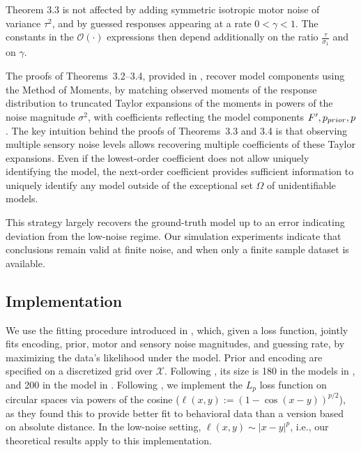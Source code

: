 \begin{thm*} %
%


Theorem 3.3 is not affected by adding symmetric isotropic motor noise of variance $\tau^2$, and by guessed responses appearing at a rate $0 < \gamma < 1$. The constants in the $\mathcal{O}(\cdot)$ expressions then depend additionally on the ratio $\frac{\tau}{\sigma_1}$ and on $\gamma$.
\end{thm*}







The proofs of Theorems~3.2--3.4, provided in , recover model components using the Method of Moments, %
by matching observed moments of the response distribution to truncated Taylor expansions of the moments in powers of the noise magnitude $\sigma^2$, with coefficients reflecting the model components $F', p_{prior}, p$.
The key intuition behind the proofs of Theorems~3.3 and 3.4 is that observing multiple sensory noise levels allows recovering multiple coefficients of these Taylor expansions. Even if the lowest-order coefficient does not allow uniquely identifying the model, the next-order coefficient provides sufficient information to uniquely identify any model outside of the exceptional set $\Omega$ of unidentifiable models.



This strategy largely recovers the ground-truth model up to an error indicating deviation from the low-noise regime.
Our simulation experiments indicate that conclusions remain valid at finite noise, and when only a finite sample dataset is available.




\subsection*{Implementation}
We use the fitting procedure introduced in \cite{hahn2024unifying}, which, given a loss function, jointly fits encoding, prior, motor and sensory noise magnitudes, and guessing rate, by maximizing the data's likelihood under the model. Prior and encoding are specified on a discretized grid over $\mathcal{X}$. Following \cite{hahn2024unifying}, its size is 180 in the models in , and 200 in the model in . Following \cite{hahn2024unifying}, we implement the $L_p$ loss function on circular spaces via powers of the cosine ($\ell(x,y) := (1-\cos(x-y))^{p/2}$), as they found this to provide better fit to behavioral data than a version based on absolute distance. In the low-noise setting, $\ell(x,y) \sim |x-y|^p$, i.e., our theoretical results apply to this implementation.


